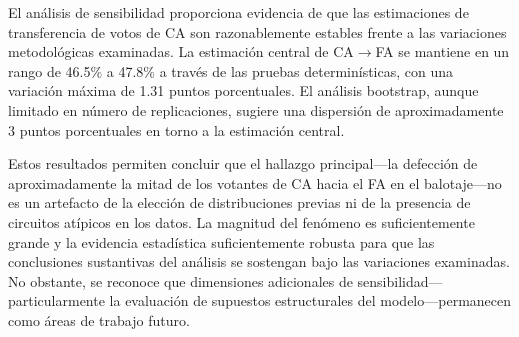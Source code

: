 El análisis de sensibilidad proporciona evidencia de que las estimaciones de transferencia de votos de CA son razonablemente estables frente a las variaciones metodológicas examinadas. La estimación central de CA$\to$FA se mantiene en un rango de 46.5\% a 47.8\% a través de las pruebas determinísticas, con una variación máxima de 1.31 puntos porcentuales. El análisis bootstrap, aunque limitado en número de replicaciones, sugiere una dispersión de aproximadamente 3 puntos porcentuales en torno a la estimación central.

Estos resultados permiten concluir que el hallazgo principal---la defección de aproximadamente la mitad de los votantes de CA hacia el FA en el balotaje---no es un artefacto de la elección de distribuciones previas ni de la presencia de circuitos atípicos en los datos. La magnitud del fenómeno es suficientemente grande y la evidencia estadística suficientemente robusta para que las conclusiones sustantivas del análisis se sostengan bajo las variaciones examinadas. No obstante, se reconoce que dimensiones adicionales de sensibilidad---particularmente la evaluación de supuestos estructurales del modelo---permanecen como áreas de trabajo futuro.
